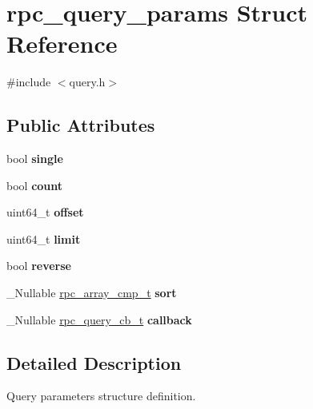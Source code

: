 \hypertarget{structrpc__query__params}{}\section{rpc\+\_\+query\+\_\+params Struct Reference}
\label{structrpc__query__params}


{\ttfamily \#include $<$query.\+h$>$}

\subsection*{Public Attributes}
\begin{DoxyCompactItemize}
\item 
\mbox{\label{structrpc__query__params_a6e4eafac062b7f7490a4983d56296385}} 
bool {\bfseries single}
\item 
\mbox{\label{structrpc__query__params_a7b488114aeb262c508dd28acc1a7fc95}} 
bool {\bfseries count}
\item 
\mbox{\label{structrpc__query__params_a4e33edf4295472adcc84d6d1ccee2ddd}} 
uint64\+\_\+t {\bfseries offset}
\item 
\mbox{\label{structrpc__query__params_a89ee7bc896675c8c2ef148436430ba0a}} 
uint64\+\_\+t {\bfseries limit}
\item 
\mbox{\label{structrpc__query__params_ad50d1e6e25322f5562ec1793647c1618}} 
bool {\bfseries reverse}
\item 
\mbox{\label{structrpc__query__params_a39c5b870500ba92953fa1794510223e8}} 
\+\_\+\+Nullable \hyperlink{object_8h_a29f4de14614637dc5848764170dcd186}{rpc\+\_\+array\+\_\+cmp\+\_\+t} {\bfseries sort}
\item 
\mbox{\label{structrpc__query__params_ad0cf32046078f82f707dc9d656bcfe01}} 
\+\_\+\+Nullable \hyperlink{query_8h_a2e4187b74c3bd970f9e41bb2d02d09a0}{rpc\+\_\+query\+\_\+cb\+\_\+t} {\bfseries callback}
\end{DoxyCompactItemize}


\subsection{Detailed Description}
Query parameters structure definition.

